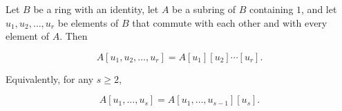Let $B$ be a ring with an identity, let $A$ be a subring of $B$ containing $1$, and let $u_1, u_2, \dots, u_r$ be elements of $B$ that commute with each other and with every element of $A$. Then

$$
A[u_1, u_2, \dots, u_r] = A[u_1][u_2] \cdots [u_r].
$$

Equivalently, for any $s \ge 2$,

$$
A[u_1, \dots, u_s] = A[u_1, \dots, u_{s-1}][u_s].
$$
